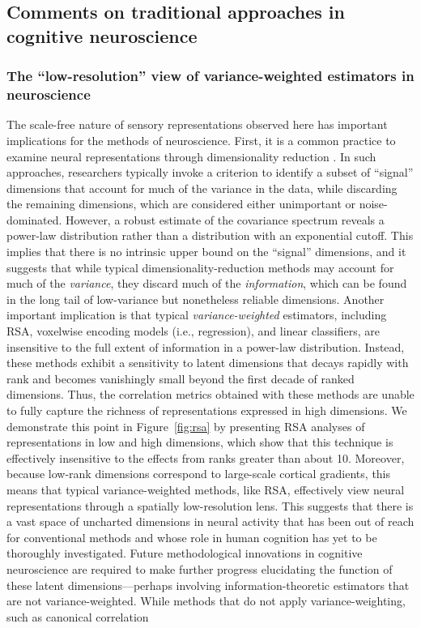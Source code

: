 \documentclass[10pt]{article}
\begin{document}
\subsection{Comments on traditional approaches in cognitive neuroscience}\label{comments-on-traditional-approaches-in-cognitive-neuroscience}

\subsubsection{The ``low-resolution'' view of variance-weighted estimators in neuroscience}\label{the-low-resolution-view-of-variance-weighted-estimators-in-neuroscience}

The scale-free nature of sensory representations observed here has important implications for the methods of neuroscience. First, it is a common practice to examine neural representations through dimensionality reduction \autocite{Cunningham2014,Huth2012,Haxby2011,Khosla2022,Lehky2014}. In such approaches, researchers typically invoke a criterion to identify a subset of ``signal'' dimensions that account for much of the variance in the data, while discarding the remaining dimensions, which are considered either unimportant or noise-dominated. However, a robust estimate of the covariance spectrum reveals a power-law distribution rather than a distribution with an exponential cutoff. This implies that there is no intrinsic upper bound on the ``signal'' dimensions, and it suggests that while typical dimensionality-reduction methods may account for much of the \emph{variance}, they discard much of the \emph{information}, which can be found in the long tail of low-variance but nonetheless reliable dimensions. Another important implication is that typical \emph{variance-weighted} estimators, including RSA, voxelwise encoding models (i.e., regression), and linear classifiers, are insensitive to the full extent of information in a power-law distribution. Instead, these methods exhibit a sensitivity to latent dimensions that decays rapidly with rank and becomes vanishingly small beyond the first decade of ranked dimensions. Thus, the correlation metrics obtained with these methods are unable to fully capture the richness of representations expressed in high dimensions. We demonstrate this point in Figure~\ref{fig:rsa} by presenting RSA analyses of representations in low and high dimensions, which show that this technique is effectively insensitive to the effects from ranks greater than about 10. Moreover, because low-rank dimensions correspond to large-scale cortical gradients, this means that typical variance-weighted methods, like RSA, effectively view neural representations through a spatially low-resolution lens. This suggests that there is a vast space of uncharted dimensions in neural activity that has been out of reach for conventional methods and whose role in human cognition has yet to be thoroughly investigated. Future methodological innovations in cognitive neuroscience are required to make further progress elucidating the function of these latent dimensions---perhaps involving information-theoretic estimators that are not variance-weighted. While methods that do not apply variance-weighting, such as canonical correlation 
\end{document}
